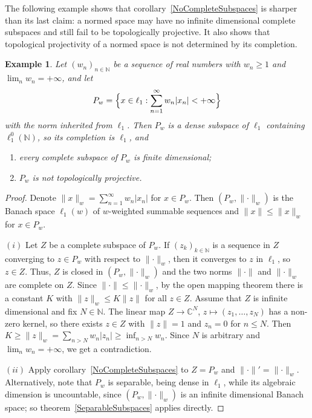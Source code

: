 \documentclass[12pt]{article}
\newtheorem{example}[theorem]{Example}
\newcommand{\lo}[1]{\ell_1^0(#1)}
\newcommand{\norm}[1]{\lVert #1\rVert}
\begin{document}
The following example shows that corollary~\ref{NoCompleteSubspaces} is
sharper than its last claim: a normed space may have no infinite dimensional
complete subspaces and still fail to be topologically projective. It also
shows that topological projectivity of a normed space is not determined by its
completion.

\begin{example}\label{WeightedExample} Let ${(w_n)}_{n\in\mathbb{N}}$ be a
    sequence of real numbers with $w_n\geq 1$ and $\lim_n w_n=+\infty$, and let
    \[
    P_w=\Bigl\{x\in\ell_1:\sum_{n=1}^\infty w_n|x_n|<+\infty\Bigr\}
    \]
    with the norm inherited from $\ell_1$. Then $P_w$ is a dense subspace of
    $\ell_1$ containing $\lo{\mathbb{N}}$, so its completion is $\ell_1$, and
    \begin{enumerate}[label = (\roman*)]
        \item every complete subspace of $P_w$ is finite dimensional;
        \item $P_w$ is not topologically projective.
    \end{enumerate}
\end{example}
\begin{proof} Denote $\norm{x}_w=\sum_{n=1}^\infty w_n|x_n|$ for $x\in P_w$.
    Then $(P_w,\norm{\cdot}_w)$ is the Banach space $\ell_1(w)$ of
    $w$-weighted summable sequences and $\norm{x}\leq\norm{x}_w$ for $x\in
    P_w$.

    $(i)$ Let $Z$ be a complete subspace of $P_w$. If ${(z_k)}_{k\in\mathbb{N}}$
    is a sequence in $Z$ converging to $z\in P_w$ with respect to
    $\norm{\cdot}_w$, then it converges to $z$ in $\ell_1$, so $z\in Z$. Thus,
    $Z$ is closed in $(P_w,\norm{\cdot}_w)$ and the two norms $\norm{\cdot}$
    and $\norm{\cdot}_w$ are complete on $Z$. Since $\norm{\cdot}\leq
    \norm{\cdot}_w$, by the open mapping theorem there is a constant $K$ with
    $\norm{z}_w\leq K\norm{z}$ for all $z\in Z$. Assume that $Z$ is infinite
    dimensional and fix $N\in\mathbb{N}$. The linear map $Z\to\mathbb{C}^N$,
    $z\mapsto(z_1,\ldots,z_N)$ has a non-zero kernel, so there exists $z\in
    Z$ with $\norm{z}=1$ and $z_n=0$ for $n\leq N$. Then
    $K\geq\norm{z}_w=\sum_{n>N}w_n|z_n|\geq\inf_{n>N}w_n$. Since $N$ is
    arbitrary and $\lim_n w_n=+\infty$, we get a contradiction.

    $(ii)$ Apply corollary~\ref{NoCompleteSubspaces} to $Z=P_w$ and
    $\norm{\cdot}'=\norm{\cdot}_w$. Alternatively, note that $P_w$ is
    separable, being dense in $\ell_1$, while its algebraic dimension is
    uncountable, since $(P_w,\norm{\cdot}_w)$ is an infinite dimensional
    Banach space; so theorem~\ref{SeparableSubspaces} applies directly.
\end{proof}
\end{document}
